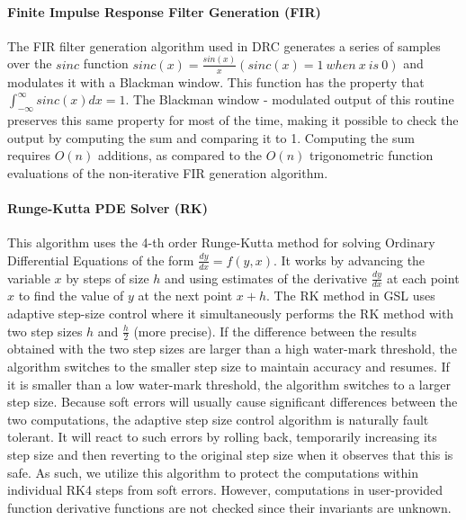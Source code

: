 \documentclass{sig-alternate}
\begin{document}
\paragraph{Finite Impulse Response Filter Generation (FIR)}
The FIR filter generation algorithm used in DRC generates a series of samples over the $sinc$ function $sinc(x)=\frac{sin(x)}{x} (sinc(x)=1\ when\ x\ is\ 0)$ and modulates it with a Blackman window.
This function has the property that $\int_{-\infty}^{\infty} sinc(x)dx = 1$. 
The Blackman window - modulated output of this routine preserves this same property for most of the time, making it possible to check the output by computing the sum and comparing it to 1.
Computing the sum requires $O(n)$ additions, as compared to the $O(n)$ trigonometric function evaluations of the non-iterative FIR generation algorithm.

\paragraph{Runge-Kutta PDE Solver (RK)}
This algorithm uses the 4-th order Runge-Kutta method for solving Ordinary Differential Equations of the form $\frac{dy}{dx} = f(y, x)$.
It works by advancing the variable $x$ by steps of size $h$ and using estimates of the derivative $\frac{dy}{dx}$ at each point $x$ to find the value of $y$ at the next point $x+h$.
The RK method in GSL uses adaptive step-size control where it simultaneously performs the RK method with two step sizes $h$ and $\frac{h}{2}$ (more precise).
If the difference between the results obtained with the two step sizes are larger than a high water-mark threshold, the algorithm switches to the smaller step size to maintain accuracy and resumes.
If it is smaller than a low water-mark threshold, the algorithm switches to a larger step size.
Because soft errors will usually cause significant differences between the two computations, the adaptive step size control algorithm is naturally fault tolerant.
It will react to such errors by rolling back, temporarily increasing its step size and then reverting to the original step size when it observes that this is safe.
As such, we utilize this algorithm to protect the computations within individual RK4 steps from soft errors.
However, computations in user-provided function derivative functions are not checked since their invariants are unknown.
\end{document}
